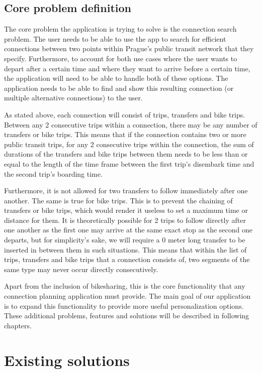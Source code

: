 \subsection{Core problem definition}

The core problem the application is trying to solve is the connection search problem. The user needs to be able to use the app to search for efficient connections between two points within Prague's public transit network that they specify. Furthermore, to account for both use cases where the user wants to depart after a certain time and where they want to arrive before a certain time, the application will need to be able to handle both of these options. The application needs to be able to find and show this resulting connection (or multiple alternative connections) to the user.

As stated above, each connection will consist of trips, transfers and bike trips. Between any 2 consecutive trips within a connection, there may be any number of transfers or bike trips. This means that if the connection contains two or more public transit trips, for any 2 consecutive trips within the connection, the sum of durations of the transfers and bike trips between them needs to be less than or equal to the length of the time frame between the first trip's disembark time and the second trip's boarding time.

Furthermore, it is not allowed for two transfers to follow immediately after one another. The same is true for bike trips. This is to prevent the chaining of transfers or bike trips, which would render it useless to set a maximum time or distance for them. It is theoretically possible for 2 trips to follow directly after one another as the first one may arrive at the same exact stop as the second one departs, but for simplicity's sake, we will require a 0 meter long transfer to be inserted in between them in such situations. This means that within the list of trips, transfers and bike trips that a connection consists of, two segments of the same type may never occur directly consecutively.

Apart from the inclusion of bikesharing, this is the core functionality that any connection planning application must provide. The main goal of our application is to expand this functionality to provide more useful personalization options. These additional problems, features and solutions will be described in following chapters.

\section{Existing solutions}

